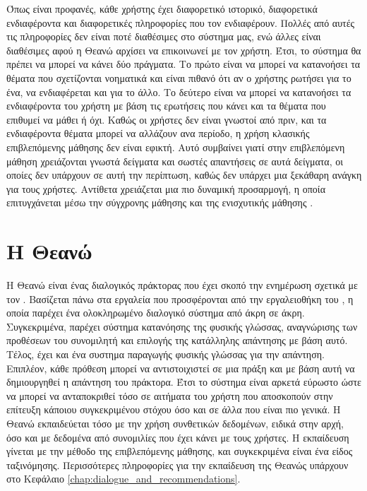Όπως είναι προφανές, κάθε χρήστης έχει διαφορετικό ιστορικό, διαφορετικά ενδιαφέροντα και διαφορετικές πληροφορίες που τον ενδιαφέρουν.
Πολλές από αυτές τις πληροφορίες δεν είναι ποτέ διαθέσιμες στο σύστημα μας, ενώ άλλες είναι διαθέσιμες αφού η Θεανώ αρχίσει να επικοινωνεί με τον χρήστη.
Έτσι, το σύστημα θα πρέπει να μπορεί να κάνει δύο πράγματα. Το πρώτο είναι να μπορεί να κατανοήσει τα θέματα που σχετίζονται νοηματικά και
είναι πιθανό ότι αν ο χρήστης ρωτήσει για το ένα, να ενδιαφέρεται και για το άλλο. Το δεύτερο είναι να μπορεί να κατανοήσει τα ενδιαφέροντα του χρήστη με βάση τις
ερωτήσεις που κάνει και τα θέματα που επιθυμεί να μάθει ή όχι. Καθώς οι χρήστες δεν είναι γνωστοί από πριν, και τα ενδιαφέροντα θέματα μπορεί να
αλλάζουν ανα περίοδο, η χρήση κλασικής επιβλεπόμενης μάθησης δεν είναι εφικτή. Αυτό συμβαίνει γιατί στην επιβλεπόμενη μάθηση χρειάζονται γνωστά
δείγματα και σωστές απαντήσεις σε αυτά δείγματα, οι οποίες δεν υπάρχουν σε αυτή την περίπτωση, καθώς δεν υπάρχει μια ξεκάθαρη ανάγκη για τους χρήστες.
Αντίθετα χρειάζεται μια πιο δυναμική προσαρμογή, η οποία επιτυγχάνεται μέσω την σύγχρονης μάθησης  και της ενισχυτικής μάθησης
.

\section{Η Θεανώ}

Η Θεανώ είναι ένας διαλογικός πράκτορας που έχει σκοπό την ενημέρωση σχετικά με τον .\cite{ventoura-etal-2021-theano}
Βασίζεται πάνω στα εργαλεία που προσφέρονται από την εργαλειοθήκη του , η οποία παρέχει ένα ολοκληρωμένο διαλογικό
σύστημα από άκρη σε άκρη. Συγκεκριμένα, παρέχει σύστημα κατανόησης της φυσικής γλώσσας, αναγνώρισης των προθέσεων του συνομιλητή και
επιλογής της κατάλληλης απάντησης με βάση αυτό. Τέλος, έχει και ένα συστημα παραγωγής φυσικής γλώσσας για την απάντηση. Επιπλέον, κάθε
πρόθεση μπορεί να αντιστοιχιστεί σε μια πράξη και με βάση αυτή να δημιουργηθεί η απάντηση του πράκτορα. Έτσι το σύστημα είναι αρκετά
εύρωστο ώστε να μπορεί να ανταποκριθεί τόσο σε αιτήματα του χρήστη που αποσκοπούν στην επίτευξη κάποιου συγκεκριμένου στόχου όσο και σε άλλα που είναι πιο γενικά.
H Θεανώ εκπαιδεύεται τόσο με την χρήση συνθετικών δεδομένων, ειδικά στην αρχή, όσο και με δεδομένα από συνομιλίες που έχει κάνει με τους χρήστες.
Η εκπαίδευση γίνεται με την μέθοδο της επιβλεπόμενης μάθησης, και συγκεκριμένα είναι ένα είδος ταξινόμησης. Περισσότερες πληροφορίες για την
εκπαίδευση της Θεανώς υπάρχουν στο Κεφάλαιο \ref{chap:dialogue_and_recommendations}.

